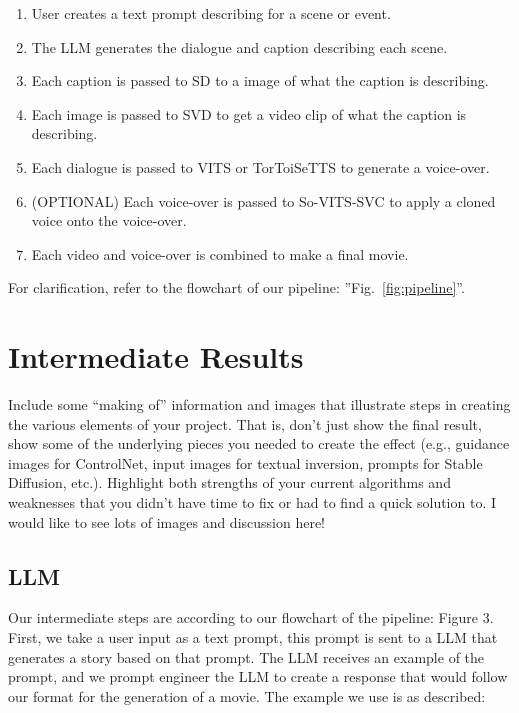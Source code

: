 \documentclass[conference]{IEEEtran}
\begin{document}
\begin{enumerate}
    \item User creates a text prompt describing for a scene or event.
    \item The LLM generates the dialogue and caption describing each scene.
    \item Each caption is passed to SD to a image of what the caption is describing.
    \item Each image is passed to SVD to get a video clip of what the caption is describing.
    \item Each dialogue is passed to VITS or TorToiSeTTS to generate a voice-over.
    \item (OPTIONAL) Each voice-over is passed to So-VITS-SVC to apply a cloned voice onto the voice-over.
    \item Each video and voice-over is combined to make a final movie.
\end{enumerate}
For clarification, refer to the flowchart of our pipeline: ''Fig.~\ref{fig:pipeline}''.

\section{Intermediate Results}

\begin{tcolorbox}
Include some “making of” information and images that illustrate steps in
creating the various elements of your project. That is, don’t just show the final result, show some of the underlying pieces you needed to create the effect (e.g., guidance images for ControlNet, input images for textual inversion, prompts for Stable Diffusion, etc.). Highlight both strengths of your current algorithms and weaknesses that you didn’t have time to fix or had to find a quick solution to. I would like to see lots of images and discussion here!
\end{tcolorbox}

\subsection{LLM}

Our intermediate steps are according to our flowchart of the pipeline: Figure 3. First, we take a user input as a text prompt, this prompt is sent to a LLM that generates a story based on that prompt. The LLM receives an example of the prompt, and we prompt engineer the LLM to create a response that would follow our format for the generation of a movie. The example we use is as described:
\end{document}
